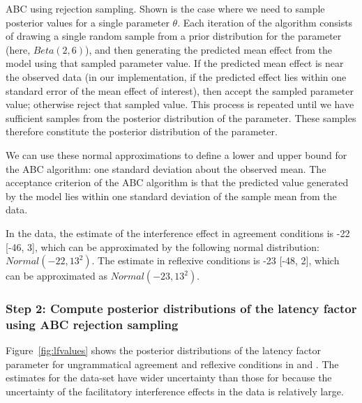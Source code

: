 \documentclass{cambridge7A}\usepackage[]{graphicx}\usepackage[]{color}
\begin{document}
\begin{algorithm}[H]
\SetAlgoLined
\caption{ABC using rejection sampling. Shown is the case where we need to sample posterior values for a single parameter $\theta$. Each iteration of the  algorithm consists of drawing a single random sample from a prior distribution for the parameter (here, $Beta(2,6)$), and then generating the predicted mean effect from the model using that sampled parameter value. If the predicted mean effect is near the observed data (in our implementation, if the predicted effect lies within one standard error of the mean effect of interest), then accept the sampled parameter value; otherwise reject that sampled value. This process is repeated until we have sufficient samples from the posterior distribution of the parameter. These samples therefore constitute the posterior distribution of the parameter.} \label{alg:abcrejection}
\end{algorithm}

We can use these normal approximations to define a lower and upper bound for the ABC algorithm: one standard deviation about the observed mean. The acceptance criterion of the ABC algorithm is that the predicted value generated by the model lies within one standard deviation of the sample mean from the data.



In the \cite{JaegerMertzenVanDykeVasishth2019} data, 
the estimate of the interference effect in agreement conditions is -22 [-46, 3], which can be approximated by the following normal distribution: $Normal(-22,13^2)$. The estimate in reflexive conditions is -23 [-48, 2], which can be approximated as  $Normal(-23,13^2)$.
  


\subsubsection{Step 2: Compute posterior distributions of the latency factor using ABC rejection sampling}

Figure~\ref{fig:lfvalues} shows the posterior distributions of the latency factor parameter for ungrammatical agreement and reflexive conditions in \cite{DillonMishlerSloggett2013} and \cite{JaegerMertzenVanDykeVasishth2019}. The estimates for the \cite{DillonMishlerSloggett2013} data-set have wider uncertainty than those for \cite{JaegerMertzenVanDykeVasishth2019} because the uncertainty of the facilitatory interference effects in the data is relatively large.
\end{document}
